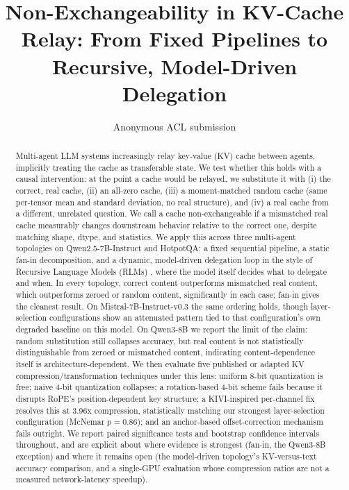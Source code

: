 \documentclass[11pt]{article}
\title{Non-Exchangeability in KV-Cache Relay: From Fixed Pipelines to Recursive, Model-Driven Delegation}
\author{Anonymous ACL submission}
\begin{document}
\maketitle

\begin{abstract}
Multi-agent LLM systems increasingly relay key-value (KV) cache between
agents, implicitly treating the cache as transferable state. We test
whether this holds with a causal intervention: at the point a cache
would be relayed, we substitute it with (i) the correct, real cache,
(ii) an all-zero cache, (iii) a moment-matched random cache (same
per-tensor mean and standard deviation, no real structure), and (iv) a
real cache from a different, unrelated question. We call a cache
non-exchangeable if a mismatched real cache measurably changes
downstream behavior relative to the correct one, despite matching
shape, dtype, and statistics. We apply this across three multi-agent
topologies on Qwen2.5-7B-Instruct and HotpotQA: a fixed sequential
pipeline, a static fan-in decomposition, and a dynamic, model-driven
delegation loop in the style of Recursive Language Models (RLMs)
\citep{rlm2026}, where the model itself decides what to delegate and
when. In every topology, correct content outperforms mismatched real
content, which outperforms zeroed or random content, significantly in
each case; fan-in gives the cleanest result. On Mistral-7B-Instruct-v0.3
the same ordering holds, though layer-selection configurations show an
attenuated pattern tied to that configuration's own degraded baseline
on this model. On Qwen3-8B we report the limit of the claim: random
substitution still collapses accuracy, but real content is not
statistically distinguishable from zeroed or mismatched content,
indicating content-dependence itself is architecture-dependent. We then
evaluate five published or adapted KV compression/transformation
techniques under this lens: uniform 8-bit quantization is free; naive
4-bit quantization collapses; a rotation-based 4-bit scheme fails
because it disrupts RoPE's position-dependent key structure; a
KIVI-inspired per-channel fix resolves this at 3.96x compression,
statistically matching our strongest layer-selection configuration
(McNemar $p=0.86$); and an anchor-based offset-correction mechanism
fails outright. We report paired significance tests and bootstrap
confidence intervals throughout, and are explicit about where evidence
is strongest (fan-in, the Qwen3-8B exception) and where it remains open
(the model-driven topology's KV-versus-text accuracy comparison, and a
single-GPU evaluation whose compression ratios are not a measured
network-latency speedup).
\end{abstract}
\end{document}
